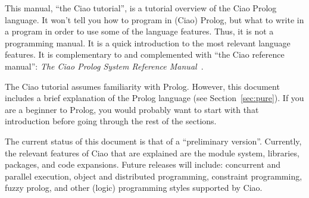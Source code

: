 
This manual, ``the Ciao tutorial'', is a tutorial overview of the Ciao
Prolog language. It won't tell you how to program in (Ciao) Prolog,
but what to write in a program in order to use some of the language
features. Thus, it is not a programming manual. It is a quick
introduction to the most relevant language features. It is
complementary to and complemented with ``the Ciao reference manual'':
{\em The Ciao Prolog System Reference Manual}~\cite{ciao-reference-manual-tr}.


The Ciao tutorial assumes familiarity with Prolog.
However, this document includes a brief explanation of the Prolog
language (see Section~\ref{sec:pure}). If you are a beginner to
Prolog, you would probably want to start with that introduction before
going through the rest of the sections. 

The current status of this document is that of a ``preliminary
version''. Currently, the relevant features of Ciao that are explained 
are the module system, libraries, packages, and code
expansions. Future releases will include: concurrent and parallel 
execution, object and distributed programming, constraint programming,
fuzzy prolog, and other (logic) programming styles supported by Ciao.

